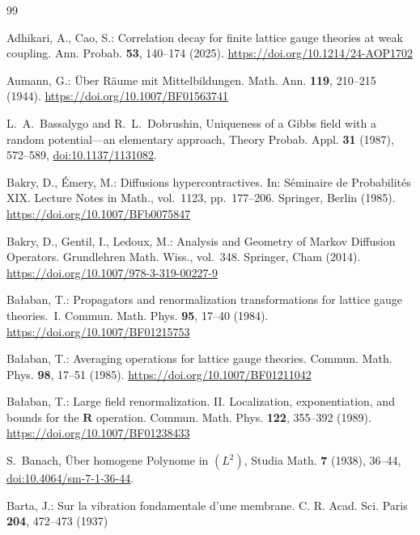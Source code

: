 \documentclass[11pt]{amsart}
\theoremstyle{definition}
\theoremstyle{remark}
\numberwithin{equation}{section}
\begin{document}
\begin{thebibliography}{99}\raggedright

Adhikari, A., Cao, S.: Correlation decay for finite lattice gauge theories at weak coupling. Ann. Probab. \textbf{53}, 140--174 (2025). \href{https://doi.org/10.1214/24-AOP1702}{https://doi.org/10.1214/24-AOP1702}

Aumann, G.: {\"U}ber R{\"a}ume mit Mittelbildungen. Math. Ann.
\textbf{119}, 210--215 (1944).
\href{https://doi.org/10.1007/BF01563741}{https://doi.org/10.1007/BF01563741}

L.~A.~Bassalygo and R.~L.~Dobrushin, Uniqueness of a Gibbs field with a
random potential---an elementary approach, Theory Probab. Appl.
\textbf{31} (1987), 572--589,
\href{https://doi.org/10.1137/1131082}{doi:10.1137/1131082}.

Bakry, D., \'Emery, M.: Diffusions hypercontractives. In: S\'eminaire de
Probabilit\'es XIX. Lecture Notes in Math., vol.~1123, pp.~177--206.
Springer, Berlin (1985).
\href{https://doi.org/10.1007/BFb0075847}{https://doi.org/10.1007/BFb0075847}

Bakry, D., Gentil, I., Ledoux, M.: Analysis and Geometry of Markov
Diffusion Operators. Grundlehren Math. Wiss., vol.~348. Springer, Cham
(2014).
\href{https://doi.org/10.1007/978-3-319-00227-9}{https://doi.org/10.1007/978-3-319-00227-9}

Ba{\l}aban, T.: Propagators and renormalization transformations for lattice
gauge theories.~I. Commun. Math. Phys. \textbf{95}, 17--40 (1984).
\href{https://doi.org/10.1007/BF01215753}{https://doi.org/10.1007/BF01215753}

Ba{\l}aban, T.: Averaging operations for lattice gauge theories. Commun.
Math. Phys. \textbf{98}, 17--51 (1985).
\href{https://doi.org/10.1007/BF01211042}{https://doi.org/10.1007/BF01211042}

Ba{\l}aban, T.: Large field renormalization. II. Localization,
exponentiation, and bounds for the $\mathbf R$ operation. Commun. Math.
Phys. \textbf{122}, 355--392 (1989).
\href{https://doi.org/10.1007/BF01238433}{https://doi.org/10.1007/BF01238433}

S.~Banach, \"Uber homogene Polynome in $(L^2)$, Studia Math. \textbf{7}
(1938), 36--44,
\href{https://doi.org/10.4064/sm-7-1-36-44}{doi:10.4064/sm-7-1-36-44}.

Barta, J.: Sur la vibration fondamentale d'une membrane. C. R. Acad. Sci. Paris \textbf{204}, 472--473 (1937)


\end{thebibliography}
\end{document}
